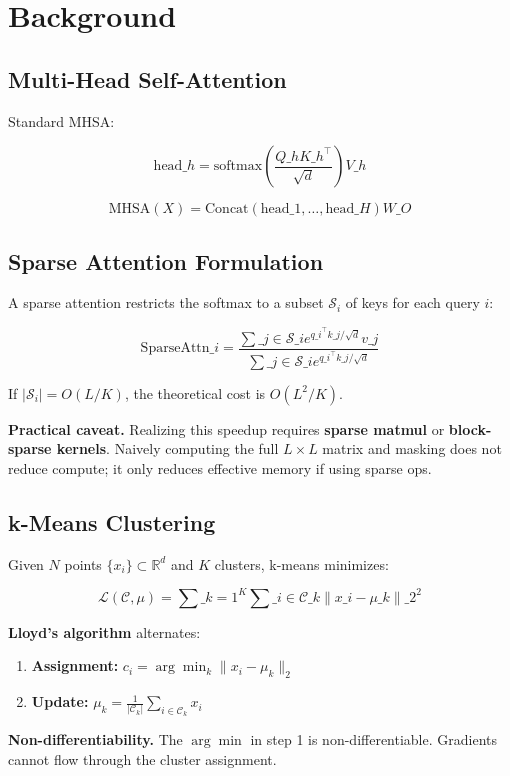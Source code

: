 
\section{Background}

\subsection{Multi-Head Self-Attention}

Standard MHSA:

\[
\text{head}\_h = \text{softmax}\!\left(\frac{Q\_h K\_h^\top}{\sqrt{d}}\right) V\_h
\tag{3.1}
\]

\[
\text{MHSA}(X) = \text{Concat}(\text{head}\_1, \dots, \text{head}\_H) W\_O
\tag{3.2}
\]

\subsection{Sparse Attention Formulation}

A sparse attention restricts the softmax to a subset $\mathcal{S}_i$ of keys 
for each query $i$:

\[
\text{SparseAttn}\_i = \frac{\sum\_{j \in \mathcal{S}\_i} e^{q\_i^\top k\_j / \sqrt{d}} v\_j}{\sum\_{j \in \mathcal{S}\_i} e^{q\_i^\top k\_j / \sqrt{d}}}
\tag{3.3}
\]

If $|\mathcal{S}_i| = O(L/K)$, the theoretical cost is $O(L^2/K)$.

\textbf{Practical caveat.} Realizing this speedup requires \textbf{sparse matmul} or 
\textbf{block-sparse kernels}. Naively computing the full $L \times L$ matrix and 
masking does not reduce compute; it only reduces effective memory if using 
sparse ops.

\subsection{k-Means Clustering}

Given $N$ points $\{x_i\} \subset \mathbb{R}^d$ and $K$ clusters, k-means 
minimizes:

\[
\mathcal{L}(\mathcal{C}, \mu) = \sum\_{k=1}^{K} \sum\_{i \in \mathcal{C}\_k} \|x\_i - \mu\_k\|\_2^2
\tag{3.4}
\]

\textbf{Lloyd's algorithm} alternates:

\begin{enumerate}
\item \textbf{Assignment:} $c_i = \arg\min_k \|x_i - \mu_k\|_2$
\item \textbf{Update:} $\mu_k = \frac{1}{|\mathcal{C}_k|} \sum_{i \in \mathcal{C}_k} x_i$

\end{enumerate}
\textbf{Non-differentiability.} The $\arg\min$ in step 1 is non-differentiable. 
Gradients cannot flow through the cluster assignment.

